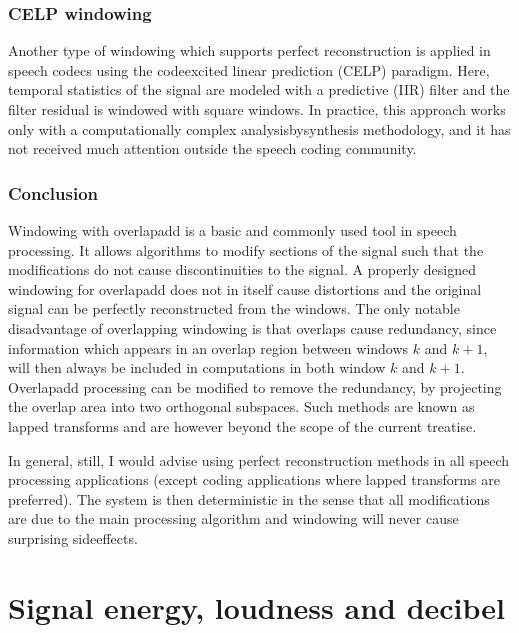 \documentclass[letterpaper,10pt,english]{jupyterBook}
\begin{document}
\subsubsection{CELP windowing}
\label{\detokenize{Representations/Windowing:celp-windowing}}
\sphinxAtStartPar
Another type of windowing which supports perfect reconstruction is
applied in speech codecs using the code\sphinxhyphen{}excited linear prediction (CELP)
paradigm. Here, temporal statistics of the signal are modeled with a
predictive (IIR) filter and the filter residual is windowed with square
windows. 
In practice, this
approach works only with a computationally complex analysis\sphinxhyphen{}by\sphinxhyphen{}synthesis
methodology, and it has not received much attention outside the speech
coding community.


\subsubsection{Conclusion}
\label{\detokenize{Representations/Windowing:conclusion}}
\sphinxAtStartPar
Windowing with overlap\sphinxhyphen{}add is a basic and commonly used
tool in speech processing. It allows algorithms to modify sections of
the signal such that the modifications do not cause discontinuities to
the signal. A properly designed windowing for overlap\sphinxhyphen{}add does not in
itself cause distortions and the original signal can be perfectly
reconstructed from the windows. The only notable disadvantage of
overlapping windowing is that overlaps cause redundancy, since
information which appears in an overlap region between windows \(k\) and
\(k+1\), will then always be included in computations in both window \(k\)
and \(k+1\). Overlap\sphinxhyphen{}add processing can be modified to remove the
redundancy, by projecting the overlap area into two orthogonal
subspaces. Such methods are known as lapped transforms and are however
beyond the scope of the current
treatise. 

\sphinxAtStartPar
In general, still, I would advise using perfect reconstruction methods
in all speech processing applications (except coding applications where
lapped transforms are preferred). The system is then deterministic in
the sense that all modifications are due to the main processing
algorithm and windowing will never cause surprising side\sphinxhyphen{}effects.

\sphinxstepscope


\section{Signal energy, loudness and decibel}
\label{\detokenize{Representations/Signal_energy_loudness_and_decibel:signal-energy-loudness-and-decibel}}\label{\detokenize{Representations/Signal_energy_loudness_and_decibel::doc}}
\end{document}

